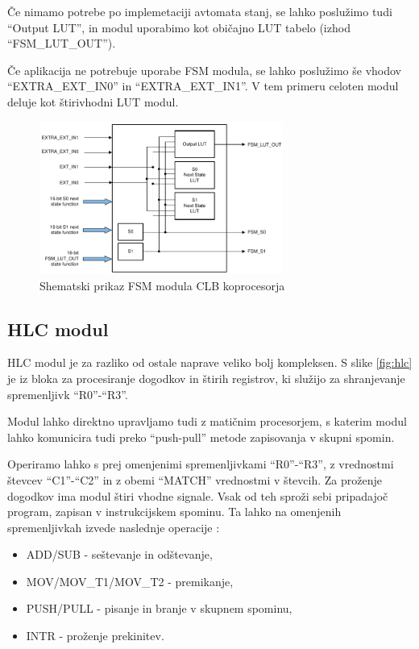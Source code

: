 \documentclass[a4paper]{article}
\begin{document}
Če nimamo potrebe po implemetaciji avtomata stanj, se lahko poslužimo tudi ``Output LUT'', in modul uporabimo kot običajno LUT tabelo (izhod ``FSM\_LUT\_OUT'').

Če aplikacija ne potrebuje uporabe FSM modula, se lahko poslužimo še vhodov ``EXTRA\_EXT\_IN0'' in ``EXTRA\_EXT\_IN1''. V tem primeru celoten modul deluje kot štirivhodni LUT modul.

\begin{figure}[htb]
    \centerline{\includegraphics[width=8cm]{shema_fsm}}
    \caption{Shematski prikaz FSM modula CLB koprocesorja \cite[Pogl.~26.4.3]{mcu-ref-manual}}
    \label{fig:fsm} 
\end{figure} 

\subsection{HLC modul}\label{sec:hlc}
HLC modul je za razliko od ostale naprave veliko bolj kompleksen. S slike \ref{fig:hlc} je iz bloka za procesiranje dogodkov in štirih registrov, ki služijo za shranjevanje spremenljivk ``R0''-``R3''\cite[Pogl.~26.4.6]{mcu-ref-manual}.

Modul lahko direktno upravljamo tudi z matičnim procesorjem, s katerim modul lahko komunicira tudi preko ``push-pull'' metode zapisovanja v skupni spomin.

Operiramo lahko s prej omenjenimi spremenljivkami ``R0''-``R3'', z vrednostmi števcev ``C1''-``C2'' in z obemi ``MATCH'' vrednostmi v števcih. Za proženje dogodkov ima modul štiri vhodne signale. Vsak od teh sproži sebi pripadajoč program, zapisan v instrukcijskem spominu. Ta lahko na omenjenih spremenljivkah izvede naslednje operacije \cite[Pogl.~26.4.6.2]{mcu-ref-manual}:
\begin{itemize}
    \item ADD/SUB - seštevanje in odštevanje,
    \item MOV/MOV\_T1/MOV\_T2 - premikanje,
    \item PUSH/PULL - pisanje in branje v skupnem spominu,
    \item INTR - proženje prekinitev.
\end{itemize}
\end{document}
